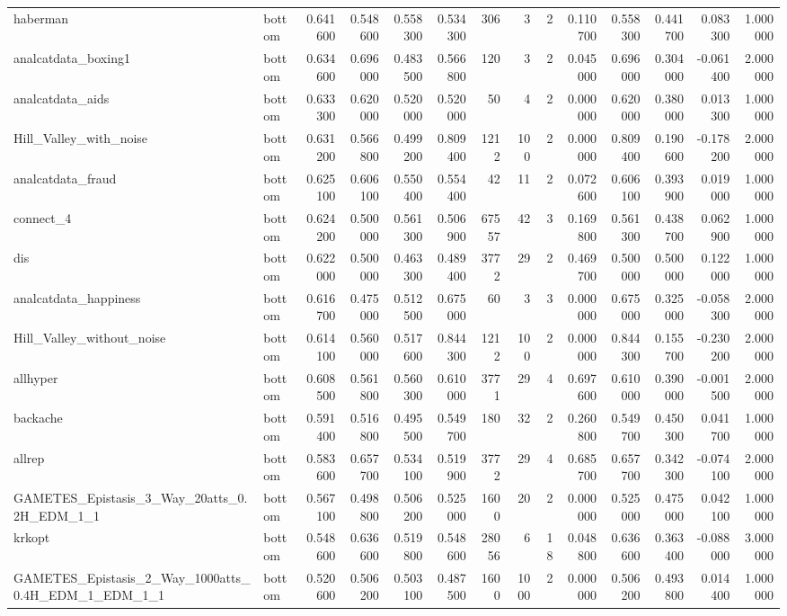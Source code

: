 \begin{longtable}{llrrrrrrrrrrrr}
haberman & bottom & 0.641600 & 0.548600 & 0.558300 & 0.534300 & 306 & 3 & 2 & 0.110700 & 0.558300 & 0.441700 & 0.083300 & 1.000000 \\
analcatdata\_boxing1 & bottom & 0.634600 & 0.696000 & 0.483500 & 0.566800 & 120 & 3 & 2 & 0.045000 & 0.696000 & 0.304000 & -0.061400 & 2.000000 \\
analcatdata\_aids & bottom & 0.633300 & 0.620000 & 0.520000 & 0.520000 & 50 & 4 & 2 & 0.000000 & 0.620000 & 0.380000 & 0.013300 & 1.000000 \\
Hill\_Valley\_with\_noise & bottom & 0.631200 & 0.566800 & 0.499200 & 0.809400 & 1212 & 100 & 2 & 0.000000 & 0.809400 & 0.190600 & -0.178200 & 2.000000 \\
analcatdata\_fraud & bottom & 0.625100 & 0.606100 & 0.550400 & 0.554400 & 42 & 11 & 2 & 0.072600 & 0.606100 & 0.393900 & 0.019000 & 1.000000 \\
connect\_4 & bottom & 0.624200 & 0.500000 & 0.561300 & 0.506900 & 67557 & 42 & 3 & 0.169800 & 0.561300 & 0.438700 & 0.062900 & 1.000000 \\
dis & bottom & 0.622000 & 0.500000 & 0.463300 & 0.489400 & 3772 & 29 & 2 & 0.469700 & 0.500000 & 0.500000 & 0.122000 & 1.000000 \\
analcatdata\_happiness & bottom & 0.616700 & 0.475000 & 0.512500 & 0.675000 & 60 & 3 & 3 & 0.000000 & 0.675000 & 0.325000 & -0.058300 & 2.000000 \\
Hill\_Valley\_without\_noise & bottom & 0.614100 & 0.560000 & 0.517600 & 0.844300 & 1212 & 100 & 2 & 0.000000 & 0.844300 & 0.155700 & -0.230200 & 2.000000 \\
allhyper & bottom & 0.608500 & 0.561800 & 0.560300 & 0.610000 & 3771 & 29 & 4 & 0.697600 & 0.610000 & 0.390000 & -0.001500 & 2.000000 \\
backache & bottom & 0.591400 & 0.516800 & 0.495500 & 0.549700 & 180 & 32 & 2 & 0.260800 & 0.549700 & 0.450300 & 0.041700 & 1.000000 \\
allrep & bottom & 0.583600 & 0.657700 & 0.534100 & 0.519900 & 3772 & 29 & 4 & 0.685700 & 0.657700 & 0.342300 & -0.074100 & 2.000000 \\
GAMETES\_Epistasis\_3\_Way\_20atts\_0.2H\_EDM\_1\_1 & bottom & 0.567100 & 0.498800 & 0.506200 & 0.525000 & 1600 & 20 & 2 & 0.000000 & 0.525000 & 0.475000 & 0.042100 & 1.000000 \\
krkopt & bottom & 0.548600 & 0.636600 & 0.519800 & 0.548600 & 28056 & 6 & 18 & 0.048800 & 0.636600 & 0.363400 & -0.088000 & 3.000000 \\
GAMETES\_Epistasis\_2\_Way\_1000atts\_0.4H\_EDM\_1\_EDM\_1\_1 & bottom & 0.520600 & 0.506200 & 0.503100 & 0.487500 & 1600 & 1000 & 2 & 0.000000 & 0.506200 & 0.493800 & 0.014400 & 1.000000 \\

\end{longtable}
